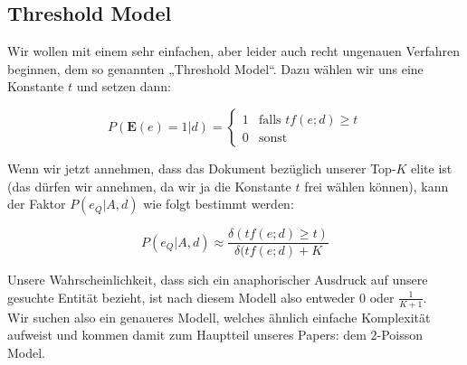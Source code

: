 \subsection{Threshold Model}

Wir wollen mit einem sehr einfachen, aber leider auch recht ungenauen Verfahren beginnen, dem so genannten „Threshold Model“. Dazu wählen wir uns eine Konstante $t$ und setzen dann:

\[ P(\textbf{E}(e) = 1|d) = \begin{cases}
	1	&	\text{falls } tf(e;d) \geq t \\
	0	&	\text{sonst}
\end{cases} \]

Wenn wir jetzt annehmen, dass das Dokument bezüglich unserer Top-$K$ elite ist (das dürfen wir annehmen, da wir ja die Konstante $t$ frei wählen können), kann der Faktor $P(e_Q|A,d)$ wie folgt bestimmt werden:

\[ P(e_Q| A,d) \approx \frac{\delta (tf(e;d) \geq t)}{\delta (tf(e;d) + K} \]

Unsere Wahrscheinlichkeit, dass sich ein anaphorischer Ausdruck auf unsere gesuchte Entität bezieht, ist nach diesem Modell also entweder 0 oder $\frac{1}{K + 1}$. \\
Wir suchen also ein genaueres Modell, welches ähnlich einfache Komplexität aufweist und kommen damit zum Hauptteil unseres Papers: dem 2-Poisson Model.
